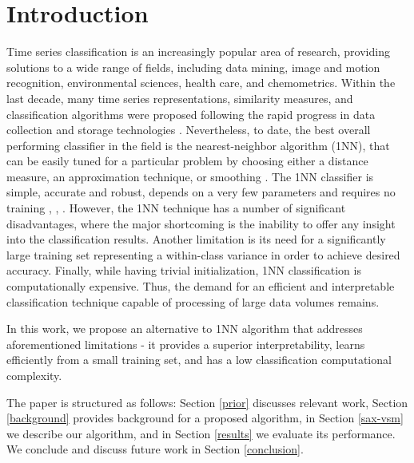 \documentclass[conference]{IEEEtran}
\begin{document}
%

\vspace{-0.1cm}
\section{Introduction}
\vspace{-0.1cm}
Time series classification is an increasingly popular area of research, providing 
solutions to a wide range of fields, including data mining, 
image and motion recognition, environmental sciences, health care, and chemometrics. 
Within the last decade, many time series representations, similarity measures, 
and classification algorithms were proposed following the rapid
progress in data collection and storage technologies \cite{review}. 
Nevertheless, to date, the best overall performing classifier in the field is
the nearest-neighbor algorithm (1NN), that can be easily tuned for a 
particular problem by choosing either a distance measure, 
an approximation technique, or smoothing \cite{review}.
The 1NN classifier is simple, accurate and robust, depends on a very few parameters 
and requires no training \cite{review}, \cite{benchmark}, \cite{classifiers}.
However, the 1NN technique has a number of significant disadvantages, 
where the major shortcoming is the inability to offer any insight into the classification results.
Another limitation is its need for a significantly large training set 
representing a within-class variance in order to achieve desired accuracy. 
Finally, while having trivial initialization, 1NN classification is computationally expensive. 
Thus, the demand for an efficient and interpretable classification technique 
capable of processing of large data volumes remains.

In this work, we propose an alternative to 1NN algorithm that addresses 
aforementioned limitations - it provides a superior interpretability, 
learns efficiently from a small training set, and has a low classification 
computational complexity.

The paper is structured as follows: 
Section \ref{prior} discusses relevant work, Section \ref{background} provides 
background for a proposed algorithm, in Section \ref{sax-vsm} we describe our algorithm, 
and in Section \ref{results} we evaluate its performance. 
We conclude and discuss future work in Section \ref{conclusion}.
\end{document}
